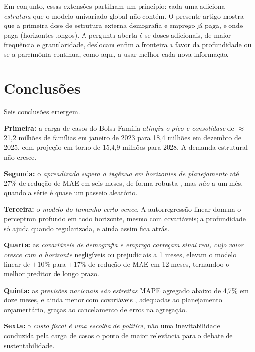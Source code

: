 \documentclass[12pt,a4paper,oneside]{article}
\begin{document}
Em conjunto, essas extensões partilham um princípio: cada uma adiciona
\emph{estrutura} que o modelo univariado global não contém. O presente
artigo mostra que a primeira dose de estrutura externa \textemdash{}
demografia e emprego \textemdash{} já paga, e onde paga (horizontes
longos). A pergunta aberta é se doses adicionais, de maior frequência e
granularidade, deslocam enfim a fronteira a favor da profundidade
\textemdash{} ou se a parcimônia continua, como aqui, a usar melhor cada
nova informação.

\section{Conclusões}
\label{sec:conclusoes}

Seis conclusões emergem.

\textbf{Primeira:} a carga de casos do Bolsa Família \emph{atingiu o pico e
consolida\-se} \textemdash{} de $\approx$ 21,2 milhões de famílias em
janeiro de 2023 para 18,4 milhões em dezembro de 2025, com projeção em
torno de 15,4,9 milhões para 2028. A demanda estrutural não
cresce.

\textbf{Segunda:} o \emph{aprendizado supera a ingênua em horizontes de
planejamento} \textemdash{} até 27\% de redução de MAE em seis meses, de
forma robusta \textemdash{}, mas \emph{não} a um mês, quando a série é
quase um passeio aleatório.

\textbf{Terceira:} o \emph{modelo do tamanho certo vence}. A autorregressão
linear domina o perceptron profundo em todo horizonte, mesmo com
covariáveis; a profundidade só ajuda quando regularizada, e ainda assim
fica atrás.

\textbf{Quarta:} as \emph{covariáveis de demografia e emprego carregam
sinal real, cujo valor cresce com o horizonte} \textemdash{} negligíveis ou
prejudiciais a 1 meses, elevam o modelo linear de $+10\%$ para
$+17\%$ de redução de MAE em 12 meses, tornando\-o o melhor preditor de
longo prazo.

\textbf{Quinta:} as \emph{previsões nacionais são estreitas} \textemdash{}
MAPE agregado abaixo de 4,7\% em doze meses, e ainda menor com covariáveis
\textemdash{}, adequadas ao planejamento orçamentário, graças ao
cancelamento de erros na agregação.

\textbf{Sexta:} o \emph{custo fiscal é uma escolha de política}, não uma
inevitabilidade conduzida pela carga de casos \textemdash{} o ponto de
maior relevância para o debate de sustentabilidade.
\end{document}
